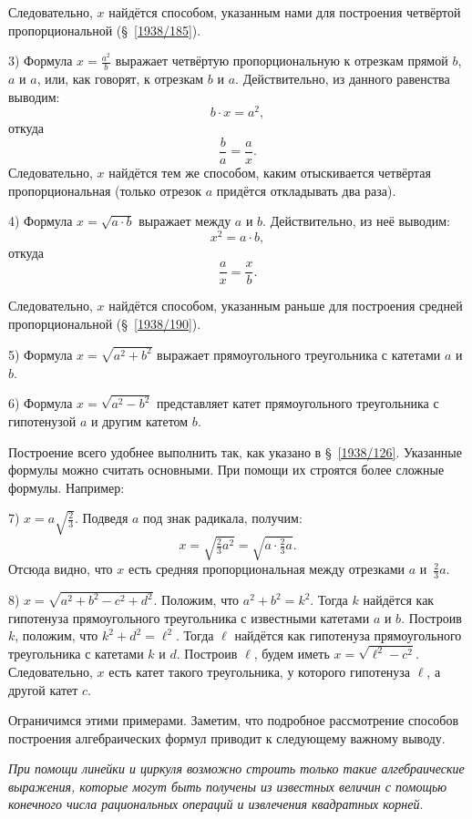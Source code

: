\documentclass[oneside]{book}
\begin{document}
Следовательно, $x$ найдётся способом, указанным нами для построения четвёртой пропорциональной (§~\ref{1938/185}).

3) Формула $x=\frac{a^2}b$ выражает четвёртую пропорциональную к отрезкам прямой $b$, $a$ и $a$, или, как говорят,  к отрезкам $b$ и $a$.
Действительно, из данного равенства выводим:
\[b\cdot x=a^2,\]
откуда
\[\frac ba=\frac ax.\]
Следовательно, $x$ найдётся тем же способом, каким отыскивается четвёртая пропорциональная (только отрезок $a$ придётся откладывать два раза).

4) Формула $x=\sqrt{a\cdot b}$ выражает  между $a$ и $b$.
Действительно, из неё выводим:
\[x^2=a\cdot b,\]
откуда
\[\frac ax=\frac xb.\]

Следовательно, $x$ найдётся способом, указанным раньше для построения средней пропорциональной (§~\ref{1938/190}).

5) Формула $x=\sqrt{a^2+b^2}$ выражает  прямоугольного треугольника с катетами $a$ и $b$.


6) Формула $x=\sqrt{a^2-b^2}$ представляет катет прямоугольного треугольника с гипотенузой $a$ и другим катетом $b$.

Построение всего удобнее выполнить так, как указано в §~\ref{1938/126}.
Указанные формулы можно считать основными.
При помощи их строятся более сложные формулы.
Например:

7) $x=a\sqrt{\frac23}$.
Подведя $a$ под знак радикала, получим:
\[x=\sqrt{\tfrac23a^2}=\sqrt{a\cdot\tfrac23a}.\]
Отсюда видно, что $x$ есть средняя пропорциональная между отрезками $a$ и~$\tfrac23a$.

8) $x=\sqrt{a^2 + b^2 - c^2 + d^2}$.
Положим, что  $a^2+b^2=k^2$.
Тогда $k$ найдётся как гипотенуза прямоугольного треугольника с известными катетами $a$ и $b$.
Построив $k$, положим, что $k^2+d^2=\ell^2$.
Тогда $\ell$ найдётся как гипотенуза прямоугольного треугольника с катетами $k$ и $d$.
Построив $\ell$, будем иметь $x=\sqrt{\ell^2-c^2}$.
Следовательно, $x$ есть катет такого треугольника, у которого гипотенуза $\ell$, а другой катет $c$.

Ограничимся этими примерами.
Заметим, что подробное рассмотрение способов построения алгебраических формул приводит к следующему важному выводу.

\emph{При помощи линейки и циркуля возможно строить только такие алгебраические выражения, которые могут быть получены из известных величин с помощью конечного числа рациональных операций %
и извлечения квадратных корней}.
\end{document}
